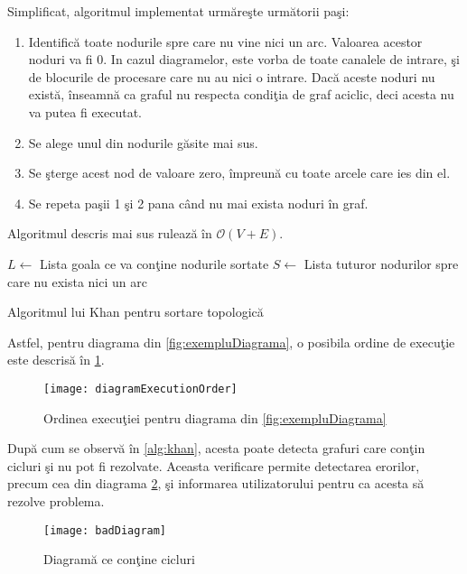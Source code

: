 Simplificat, algoritmul implementat urmăreşte următorii paşi:
\begin{enumerate}
	\item Identifică toate nodurile spre care nu vine nici un arc. Valoarea acestor noduri va fi $0$. In cazul diagramelor, este vorba de toate canalele de intrare, şi de blocurile de procesare care nu au nici o intrare. Dacă aceste noduri nu există, înseamnă ca graful nu respecta condiţia de graf aciclic, deci acesta nu va putea fi executat.
	\item Se alege unul din nodurile găsite mai sus.
	\item Se şterge acest nod de valoare zero, împreună cu toate arcele care ies din el.
	\item Se repeta paşii 1 şi 2 pana când nu mai exista noduri în graf.
\end{enumerate}
Algoritmul descris mai sus rulează în $\mathcal{O}(V + E)$. 

\begin{algorithm}[H]
	$L \gets$ Lista goala ce va conţine nodurile sortate \;
	$S \gets$ Lista tuturor nodurilor spre care nu exista nici un arc \;
{}{
	{}
}
\label{alg:khan}
\caption{Algoritmul lui Khan pentru sortare topologică}
\end{algorithm}

Astfel, pentru diagrama din \cref{fig:exempluDiagrama}, o posibila ordine de execuţie este descrisă în \cref{fig:executionOrder}.
\begin{figure}[H]
	\centering
	\texttt{[image: diagramExecutionOrder]}
	\caption{Ordinea execuţiei pentru diagrama din \cref{fig:exempluDiagrama}}
	\label{fig:executionOrder}
\end{figure}
După cum se observă în \cref{alg:khan}, acesta poate detecta grafuri care conţin cicluri şi nu pot fi rezolvate. Aceasta verificare permite detectarea erorilor, precum cea din diagrama \ref{fig:badDiagram}, şi informarea utilizatorului pentru ca acesta să rezolve problema.
\begin{figure}[H]
	\centering
	\texttt{[image: badDiagram]}
	\caption{Diagramă ce conţine cicluri}
	\label{fig:badDiagram}
\end{figure}

